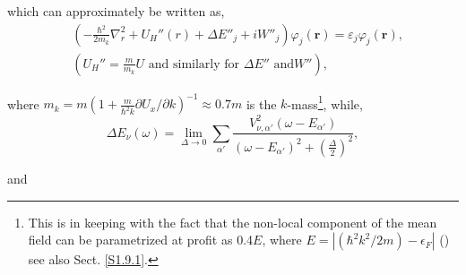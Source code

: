 which can approximately be written as,
\begin{align}
  \label{eq:2}
\nonumber & \left( -\frac{\hbar^2}{2m_k} \nabla_r^2 + U_H''(r) + \Delta E''_j + iW''_j \right) \varphi_j(\mathbf r)= \varepsilon_j\varphi_j(\mathbf r), \\
& \left( U_H'' = \frac{m}{m_k} U\text{ and similarly for }\Delta E''\text{ and} W'' \right), 
\end{align}



 where  $m_k=m\left(1+\frac{m}{\hbar^2 k}\partial U_x/\partial k\right)^{-1}\approx 0.7m$ is the $k$-mass\footnote{\label{f46C2}This is in keeping with the fact that the non-local component of the mean field can be parametrized at profit as 0.4$E$, where $E=|(\hbar^2k^2/2m)-\epsilon_F|$ (\cite{Perey:62}) see also Sect. \ref{S1.9.1}.},   while,
\begin{equation}\label{eqn:37a}
\Delta E_\nu(\omega)  = \lim_{\Delta \rightarrow 0} \sum_{\alpha'} \frac{V^2_{\nu ,\alpha'} (\omega-E_{\alpha'})}{(\omega -E_{\alpha'})^2 + (\frac{\Delta}{2})^2},
\end{equation}


\noindent and

